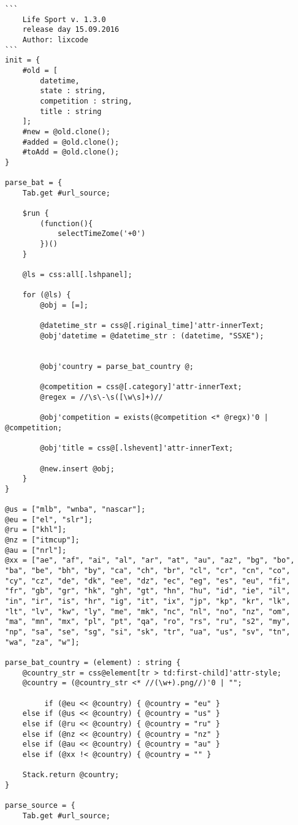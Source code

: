 \begin{verbatim}
```
	Life Sport v. 1.3.0
	release day 15.09.2016
	Author: lixcode
```
init = {
	#old = [
		datetime, 
		state : string, 
		competition : string,
		title : string
	];
	#new = @old.clone();
	#added = @old.clone();
	#toAdd = @old.clone();
}

parse_bat = {
	Tab.get #url_source;

	$run {
		(function(){
			selectTimeZome('+0')
		})()
	}

	@ls = css:all[.lshpanel];

	for (@ls) {
		@obj = [=];

		@datetime_str = css@[.riginal_time]'attr-innerText;
		@obj'datetime = @datetime_str : (datetime, "SSXE");

		
		@obj'country = parse_bat_country @;

		@competition = css@[.category]'attr-innerText;
		@regex = //\s\-\s([\w\s]+)//
		
		@obj'competition = exists(@competition <* @regx)'0 | @competition;

		@obj'title = css@[.lshevent]'attr-innerText;

		@new.insert @obj;
	}
}

@us = ["mlb", "wnba", "nascar"];
@eu = ["el", "slr"];
@ru = ["khl"];
@nz = ["itmcup"];
@au = ["nrl"];
@xx = ["ae", "af", "ai", "al", "ar", "at", "au", "az", "bg", "bo", "ba", "be", "bh", "by", "ca", "ch", "br", "cl", "cr", "cn", "co", "cy", "cz", "de", "dk", "ee", "dz", "ec", "eg", "es", "eu", "fi", "fr", "gb", "gr", "hk", "gh", "gt", "hn", "hu", "id", "ie", "il", "in", "ir", "is", "hr", "ig", "it", "ix", "jp", "kp", "kr", "lk", "lt", "lv", "kw", "ly", "me", "mk", "nc", "nl", "no", "nz", "om", "ma", "mn", "mx", "pl", "pt", "qa", "ro", "rs", "ru", "s2", "my", "np", "sa", "se", "sg", "si", "sk", "tr", "ua", "us", "sv", "tn", "wa", "za", "w"];

parse_bat_country = (element) : string {
	@country_str = css@element[tr > td:first-child]'attr-style;
	@country = (@country_str <* //(\w+).png//)'0 | "";

	     if (@eu << @country) { @country = "eu" }
	else if (@us << @country) { @country = "us" }
	else if (@ru << @country) { @country = "ru" }
	else if (@nz << @country) { @country = "nz" }
	else if (@au << @country) { @country = "au" }
	else if (@xx !< @country) { @country = "" }

	Stack.return @country;
}

parse_source = {
	Tab.get #url_source;


\end{verbatim}
